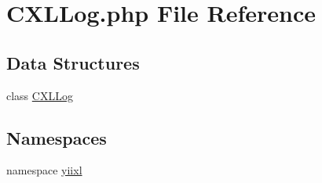 \hypertarget{CXLLog_8php}{
\section{CXLLog.php File Reference}
\label{CXLLog_8php}
}
\subsection*{Data Structures}
\begin{DoxyCompactItemize}
\item 
class \hyperlink{classCXLLog}{CXLLog}
\end{DoxyCompactItemize}
\subsection*{Namespaces}
\begin{DoxyCompactItemize}
\item 
namespace \hyperlink{namespaceyiixl}{yiixl}
\end{DoxyCompactItemize}
